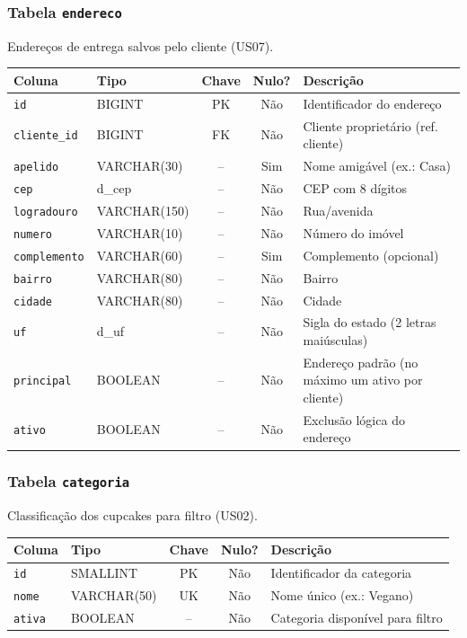 \subsubsection{Tabela \texttt{endereco}}
\noindent Endereços de entrega salvos pelo cliente (US07).\par\smallskip
\begingroup\footnotesize\renewcommand{\arraystretch}{1.2}
\begin{longtable}{|p{3.0cm}|p{2.6cm}|c|c|p{5.6cm}|}
\hline
\rowcolor{gray!40}\textbf{Coluna} & \textbf{Tipo} & \textbf{Chave} & \textbf{Nulo?} & \textbf{Descrição} \\ \hline
\endhead
\texttt{id} & BIGINT & PK & Não & Identificador do endereço \\ \hline
\texttt{cliente\_id} & BIGINT & FK & Não & Cliente proprietário (ref. cliente) \\ \hline
\texttt{apelido} & VARCHAR(30) & -- & Sim & Nome amigável (ex.: Casa) \\ \hline
\texttt{cep} & d\_cep & -- & Não & CEP com 8 dígitos \\ \hline
\texttt{logradouro} & VARCHAR(150) & -- & Não & Rua/avenida \\ \hline
\texttt{numero} & VARCHAR(10) & -- & Não & Número do imóvel \\ \hline
\texttt{complemento} & VARCHAR(60) & -- & Sim & Complemento (opcional) \\ \hline
\texttt{bairro} & VARCHAR(80) & -- & Não & Bairro \\ \hline
\texttt{cidade} & VARCHAR(80) & -- & Não & Cidade \\ \hline
\texttt{uf} & d\_uf & -- & Não & Sigla do estado (2 letras maiúsculas) \\ \hline
\texttt{principal} & BOOLEAN & -- & Não & Endereço padrão (no máximo um ativo por cliente) \\ \hline
\texttt{ativo} & BOOLEAN & -- & Não & Exclusão lógica do endereço \\ \hline
\end{longtable}
\endgroup
\subsubsection{Tabela \texttt{categoria}}
\noindent Classificação dos cupcakes para filtro (US02).\par\smallskip
\begingroup\footnotesize\renewcommand{\arraystretch}{1.2}
\begin{longtable}{|p{3.0cm}|p{2.6cm}|c|c|p{5.6cm}|}
\hline
\rowcolor{gray!40}\textbf{Coluna} & \textbf{Tipo} & \textbf{Chave} & \textbf{Nulo?} & \textbf{Descrição} \\ \hline
\endhead
\texttt{id} & SMALLINT & PK & Não & Identificador da categoria \\ \hline
\texttt{nome} & VARCHAR(50) & UK & Não & Nome único (ex.: Vegano) \\ \hline
\texttt{ativa} & BOOLEAN & -- & Não & Categoria disponível para filtro \\ \hline
\end{longtable}
\endgroup
